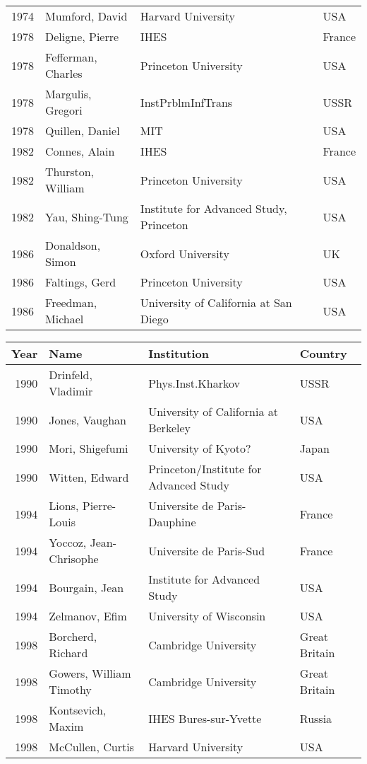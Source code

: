 \begin{tabular}{|r|l|l|l|}
1974&Mumford, David    &Harvard University        &USA \\
1978&Deligne, Pierre   &IHES             &France \\
1978&Fefferman, Charles&Princeton University      &USA \\
1978&Margulis, Gregori &InstPrblmInfTrans&USSR \\
1978&Quillen, Daniel   &MIT              &USA \\
1982&Connes, Alain     &IHES             &France \\
1982&Thurston, William &Princeton University      &USA \\
1982&Yau, Shing-Tung   &Institute for Advanced Study, Princeton              &USA \\
1986&Donaldson, Simon  &Oxford University         &UK \\
1986&Faltings, Gerd    &Princeton University      &USA \\
1986&Freedman, Michael &University of California at San Diego     &USA \\
\hline
\end{tabular}

\begin{tabular}{|r|l|l|l|} \hline

{Year} & {Name} & {Institution} &{Country}
 \\ \hline

1990&Drinfeld, Vladimir&Phys.Inst.Kharkov&USSR \\
1990&Jones, Vaughan    &University of California at Berkeley      &USA \\
1990&Mori, Shigefumi   &University of Kyoto?      &Japan \\
1990&Witten, Edward    &Princeton/Institute for Advanced Study&USA \\
1994& Lions, Pierre-Louis &Universite de Paris-Dauphine&France\\
  1994& Yoccoz, Jean-Chrisophe       &Universite de Paris-Sud&France\\
  1994& Bourgain, Jean               &Institute for Advanced Study&USA\\
  1994&  Zelmanov, Efim               &University of Wisconsin&USA\\
1998&  Borcherd, Richard         &Cambridge University&Great Britain \\
  1998& Gowers, William Timothy     &Cambridge University&Great Britain\\
  1998& Kontsevich, Maxim           &IHES Bures-sur-Yvette&Russia\\
  1998& McCullen, Curtis&Harvard University&USA\\
\hline
\end{tabular}



